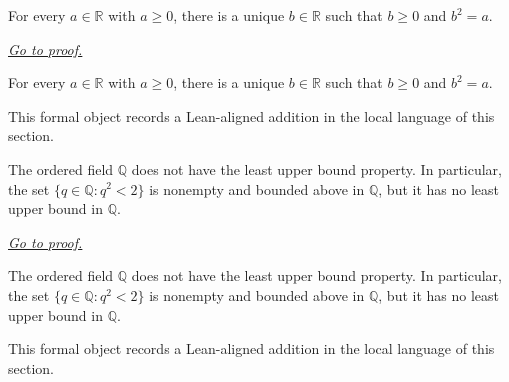 \begin{theorem}
\label{thm:exists-unique-nonneg-sqrt}
For every $a\in\mathbb R$ with $a\ge0$, there is a unique $b\in\mathbb R$ such that $b\ge0$ and $b^2=a$.

\smallskip
\noindent
\hyperref[prf:exists-unique-nonneg-sqrt]{\textit{Go to proof.}}
\end{theorem}

\begin{remark*}
For every $a\in\mathbb R$ with $a\ge0$, there is a unique $b\in\mathbb R$ such that $b\ge0$ and $b^2=a$.
\end{remark*}

\begin{remark*}[Interpretation]
This formal object records a Lean-aligned addition in the local language of this section.
\end{remark*}

\begin{dependencies}
\NoLocalDependencies
\end{dependencies}
\begin{theorem}
\label{thm:rationals-lack-lub-property}
The ordered field $\mathbb Q$ does not have the least upper bound property. In particular, the set $\{q\in\mathbb Q:q^2<2\}$ is nonempty and bounded above in $\mathbb Q$, but it has no least upper bound in $\mathbb Q$.

\smallskip
\noindent
\hyperref[prf:rationals-lack-lub-property]{\textit{Go to proof.}}
\end{theorem}

\begin{remark*}
The ordered field $\mathbb Q$ does not have the least upper bound property. In particular, the set $\{q\in\mathbb Q:q^2<2\}$ is nonempty and bounded above in $\mathbb Q$, but it has no least upper bound in $\mathbb Q$.
\end{remark*}

\begin{remark*}[Interpretation]
This formal object records a Lean-aligned addition in the local language of this section.
\end{remark*}

\begin{dependencies}
\NoLocalDependencies
\end{dependencies}
